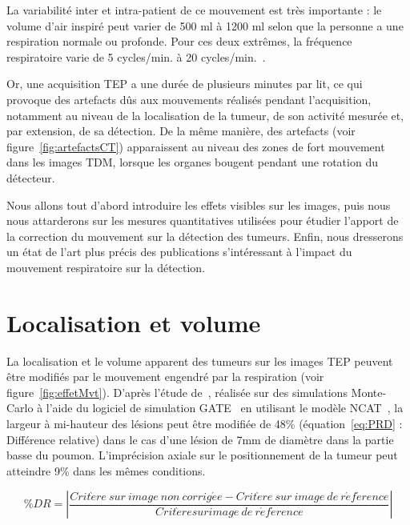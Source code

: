 La variabilité inter et intra-patient de ce mouvement est très importante : le volume d'air inspiré peut varier de 500 ml à 1200 ml selon que la personne a une respiration normale ou profonde. Pour ces deux extrêmes, la fréquence respiratoire varie de 5 cycles/min. à 20 cycles/min.~\cite{sherwood2006fundamentals}.

Or, une acquisition TEP a une durée de plusieurs minutes par lit, ce qui provoque des artefacts dûs aux mouvements réalisés pendant l'acquisition, notamment au niveau de la localisation de la tumeur, de son activité mesurée et, par extension, de sa détection. De la même manière, des artefacts (voir figure~\ref{fig:artefactsCT}) apparaissent au niveau des zones de fort mouvement dans les images TDM, lorsque les organes bougent pendant une rotation du détecteur.

Nous allons tout d'abord introduire les effets visibles sur les images, puis nous nous attarderons sur les mesures quantitatives utilisées pour étudier l'apport de la correction du mouvement sur la détection des tumeurs. Enfin, nous dresserons un état de l'art plus précis des publications s'intéressant à l'impact du mouvement respiratoire sur la détection.

\section{Localisation et volume}


La localisation et le volume apparent des tumeurs sur les images TEP peuvent être modifiés par le mouvement engendré par la respiration (voir figure~\ref{fig:effetMvt}). D'après l'étude de~\cite{lamare2007respiratory}, réalisée sur des simulations Monte-Carlo à l'aide du logiciel de simulation GATE~\cite{jan2004gate} en utilisant le modèle NCAT~\cite{segars2001These}, la largeur à mi-hauteur des lésions peut être modifiée de 48\% (équation~\ref{eq:PRD} : Différence relative) dans le cas d'une lésion de 7mm de diamètre dans la partie basse du poumon. L'imprécision axiale sur le positionnement de la tumeur peut atteindre 9\% dans les mêmes conditions.

\begin{equation}
\%DR= \left| \frac{Crit\grave{e}re~sur~image~non~corrig\acute{e}e - Crit\grave{e}re~sur~image~de~r\acute{e}f\acute{e}rence}{Crit\grave{e}re sur image~de~r\acute{e}f\acute{e}rence} \right|
\label{eq:PRD}
\end{equation}


